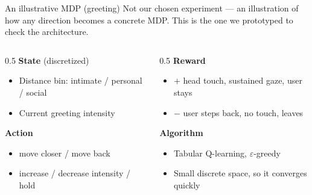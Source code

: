 \documentclass[aspectratio=169,10pt]{beamer}
\begin{document}
\begin{frame}{An illustrative MDP (greeting)}
  {\footnotesize Not our chosen experiment --- an illustration of how any direction becomes a concrete MDP. This is the one we prototyped to check the architecture.}
  \vspace{0.3em}
  \begin{columns}[T]
    \begin{column}{0.5\textwidth}
      \textbf{State} (discretized)
      \begin{itemize}\footnotesize
        \item Distance bin: intimate / personal / social
        \item Current greeting intensity
      \end{itemize}
      \textbf{Action}
      \begin{itemize}\footnotesize
        \item move closer / move back
        \item increase / decrease intensity / hold
      \end{itemize}
    \end{column}
    \begin{column}{0.5\textwidth}
      \textbf{Reward}
      \begin{itemize}\footnotesize
        \item $+$ head touch, sustained gaze, user stays
        \item $-$ user steps back, no touch, leaves
      \end{itemize}
      \textbf{Algorithm}
      \begin{itemize}\footnotesize
        \item Tabular Q-learning, $\varepsilon$-greedy
        \item Small discrete space, so it converges quickly
      \end{itemize}
    \end{column}
  \end{columns}
\end{frame}
\end{document}
